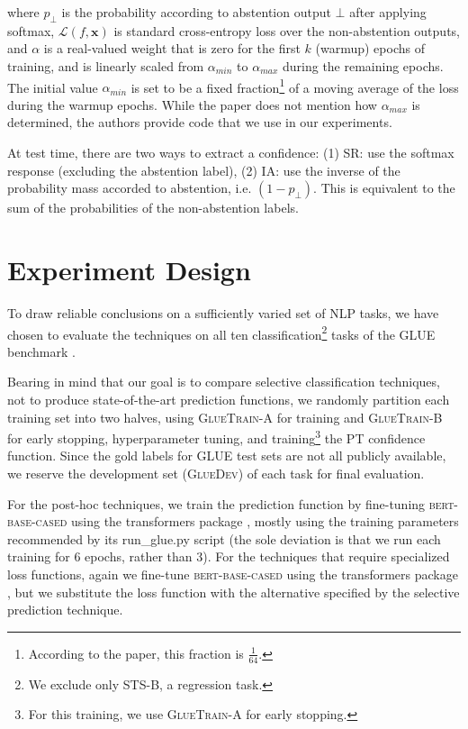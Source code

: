 \documentclass[11pt]{article}
\begin{document}
\noindent where $p_\bot$ is the probability according to abstention output $\bot$ after applying softmax, $\mathcal{L}(f, \mathbf{x})$ is standard cross-entropy loss over the non-abstention outputs, and $\alpha$ is a real-valued weight that is zero for the first $k$ (warmup) epochs of training, and is linearly scaled from $\alpha_{min}$ to $\alpha_{max}$ during the remaining epochs. The initial value $\alpha_{min}$ is set to be a fixed fraction\footnote{According to the paper, this fraction is $\frac{1}{64}$.} of a moving average of the loss during the warmup epochs. While the paper does not mention how $\alpha_{max}$ is determined, the authors provide code that we use in our experiments.

At test time, there are two ways to extract a confidence: (1) SR: use the softmax response (excluding the abstention label), (2) IA: use the inverse of the probability mass accorded to abstention, i.e. $(1-p_\bot)$. This is equivalent to the sum of the probabilities of the non-abstention labels.

\section{Experiment Design}
\label{sec:expdesign}

To draw reliable conclusions on a sufficiently varied set of NLP tasks, we have chosen to evaluate the techniques on all ten classification\footnote{We exclude only STS-B, a regression task.} tasks of the \textsc{GLUE} benchmark \cite{wang-etal-2018-glue}.


Bearing in mind that our goal is to compare selective classification techniques, not to produce state-of-the-art prediction functions, we randomly partition each training set into two halves, using \textsc{GlueTrain-A} for training and \textsc{GlueTrain-B} for early stopping, hyperparameter tuning, and training\footnote{For this training, we use \textsc{GlueTrain-A} for early stopping.} the PT confidence function. Since the gold labels for GLUE test sets are not all publicly available, we reserve the development set (\textsc{GlueDev}) of each task for final evaluation. 

For the post-hoc techniques, we train the prediction function by fine-tuning \textsc{bert-base-cased} using the transformers package \cite{wolf-etal-2020-transformers}, mostly using the training parameters recommended by its run\_glue.py script (the sole deviation is that we run each training for 6 epochs, rather than 3). For the techniques that require specialized loss functions, again we fine-tune \textsc{bert-base-cased} using the transformers package \cite{wolf-etal-2020-transformers}, but we substitute the loss function with the alternative specified by the selective prediction technique. 
\end{document}

